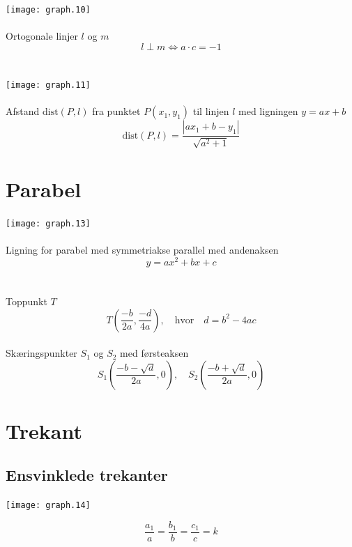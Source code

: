 \documentclass[11pt,a5paper,fleqn,leqno]{book}
\begin{document}
\texttt{[image: graph.10]}
\\
\\
Ortogonale linjer $l$ og $m$
\begin{equation}
l \perp m \Leftrightarrow a \cdot c = -1
\end{equation}
\\
\\
\texttt{[image: graph.11]}
\\
\\
Afstand $\text{dist}(P,l)$ fra punktet $P(x_1,y_1)$ til linjen $l$ med ligningen $y = ax+b$
\begin{equation}
\text{dist}(P,l) = \frac{|ax_1 + b - y_1|}{\sqrt{a^2 + 1}}
\end{equation}

\vfill

\section{Parabel}

\texttt{[image: graph.13]}
\\
\\
Ligning for parabel med symmetriakse parallel med andenaksen
\begin{equation}
y = ax^2 + bx +c
\end{equation}
\\
\\
Toppunkt $T$
\begin{equation}
T\left(\frac{-b}{2a}, \frac{-d}{4a}\right), \quad \text{hvor} \quad d = b^2 - 4ac
\end{equation}
\\
Skæringspunkter $S_1$ og $S_2$ med førsteaksen
\begin{equation}
S_1\left(\frac{-b - \sqrt{d}}{2a}, 0\right), \quad S_2\left(\frac{-b + \sqrt{d}}{2a}, 0\right)
\end{equation}

\newpage

\section{Trekant}

\subsection{Ensvinklede trekanter}

\texttt{[image: graph.14]}

\begin{equation}
\frac{a_1}{a} = \frac{b_1}{b} = \frac{c_1}{c} = k
\end{equation}
\end{document}
